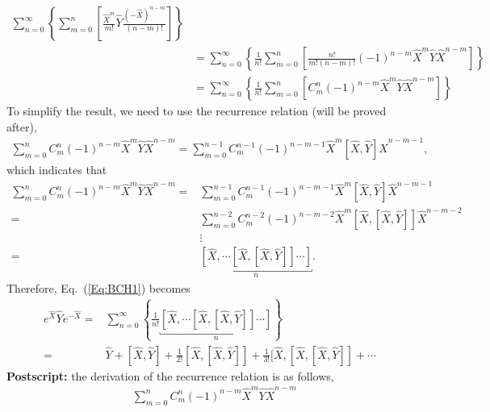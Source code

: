 \documentclass[journal=jacsat,manuscript=article,layout=traditional]{achemso}
\begin{document}
\begin{appendix}
\begin{align}
    \sum_{n=0}^{\infty}\left\{
    \sum_{m=0}^n\left[
    \frac{\hat{X}^m}{m!}\hat{Y}
    \frac{(-\hat{X})^{n-m}}{(n-m)!}
    \right]
    \right\}\\
    \nonumber
    &=\sum_{n=0}^{\infty}\left\{
    \frac{1}{n!}\sum_{m=0}^n\left[
    \frac{n!}{m!(n-m)!}(-1)^{n-m}\hat{X}^m\hat{Y}\hat{X}^{n-m}
    \right]
    \right\}\\
    \label{Eq:BCH1}
    &=\sum_{n=0}^{\infty}\left\{
    \frac{1}{n!}\sum_{m=0}^n\left[
    C_m^n(-1)^{n-m}\hat{X}^m\hat{Y}\hat{X}^{n-m}
    \right]
    \right\}
\end{align}
To simplify the result, we need to use the recurrence relation (will be proved after), 
\begin{align}
    \sum_{m=0}^{n}
    C_m^{n}(-1)^{n-m}\hat{X}^m\hat{Y}\hat{X}^{n-m}=
    \sum_{m=0}^{n-1}
    C_m^{n-1}(-1)^{n-m-1}\hat{X}^m\left[\hat{X},\hat{Y}\right]\hat{X}^{n-m-1},
\end{align}
which indicates that
\begin{align}
    \nonumber
    \sum_{m=0}^{n}
    C_m^{n}(-1)^{n-m}\hat{X}^m\hat{Y}\hat{X}^{n-m}=&
    \sum_{m=0}^{n-1}
    C_m^{n-1}(-1)^{n-m-1}\hat{X}^m\left[\hat{X},\hat{Y}\right]\hat{X}^{n-m-1}\\
    \nonumber
    =&
    \sum_{m=0}^{n-2}
    C_m^{n-2}(-1)^{n-m-2}\hat{X}^m\left[\hat{X},\left[\hat{X},\hat{Y}\right]\right]\hat{X}^{n-m-2}\\
    \nonumber
    &\vdots\\
    =&
    \underbracket{\left[\hat{X},\cdots\left[\hat{X},\left[\hat{X},\hat{Y}\right]\right]\cdots\right]}_{n}.
\end{align}
Therefore, Eq.~(\ref{Eq:BCH1}) becomes
\begin{align}
    e^{\hat{X}}\hat{Y}e^{-\hat{X}}=&
    \sum_{n=0}^{\infty}\left\{
    \frac{1}{n!}
    \underbracket{\left[\hat{X},\cdots\left[\hat{X},\left[\hat{X},\hat{Y}\right]\right]\cdots\right]}_{n}
    \right\}\\
    =&\hat{Y}+[\hat{X},\hat{Y}]+\frac{1}{2!}[\hat{X},[\hat{X},\hat{Y}]]+\frac{1}{3!}[\hat{X},[\hat{X},[\hat{X},\hat{Y}]]+\cdots
\end{align}
\textbf{Postscript:} the derivation of the recurrence relation is as follows,
\begin{align}
    \nonumber
    &\sum_{m=0}^{n}
    C_m^{n}(-1)^{n-m}\hat{X}^m\hat{Y}\hat{X}^{n-m}\\

\end{align}
\end{appendix}
\end{document}
